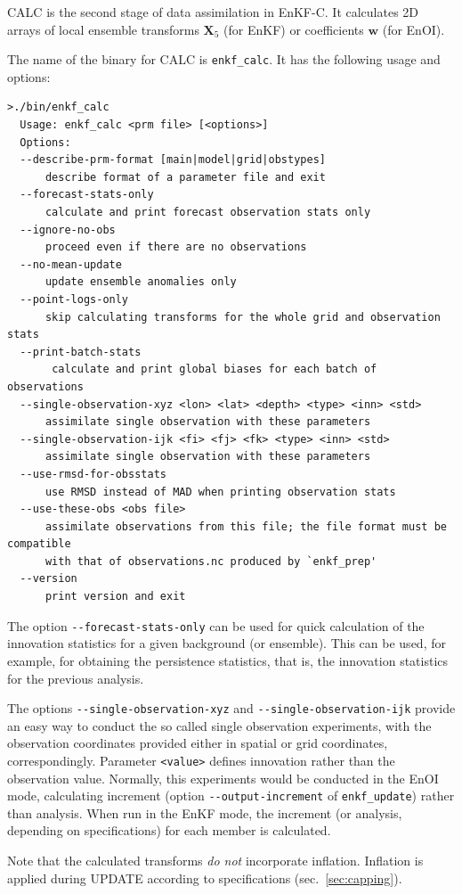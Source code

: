 \documentclass[11pt]{report}
\newcommand{\mb} {\mathbf}
\begin{document}
CALC is the second stage of data assimilation in EnKF-C.
It calculates 2D arrays of local ensemble transforms $\mb X_5$ (for EnKF) or coefficients $\mb w$ (for EnOI).

The name of the binary for CALC is \verb|enkf_calc|.
It has the following usage and options:
\begin{Verbatim}[frame=single,fontsize=\footnotesize]
>./bin/enkf_calc 
  Usage: enkf_calc <prm file> [<options>]
  Options:
  --describe-prm-format [main|model|grid|obstypes]
      describe format of a parameter file and exit
  --forecast-stats-only
      calculate and print forecast observation stats only
  --ignore-no-obs
      proceed even if there are no observations
  --no-mean-update
      update ensemble anomalies only
  --point-logs-only
      skip calculating transforms for the whole grid and observation stats
  --print-batch-stats
       calculate and print global biases for each batch of observations
  --single-observation-xyz <lon> <lat> <depth> <type> <inn> <std>
      assimilate single observation with these parameters
  --single-observation-ijk <fi> <fj> <fk> <type> <inn> <std>
      assimilate single observation with these parameters
  --use-rmsd-for-obsstats
      use RMSD instead of MAD when printing observation stats
  --use-these-obs <obs file>
      assimilate observations from this file; the file format must be compatible
      with that of observations.nc produced by `enkf_prep'
  --version
      print version and exit
\end{Verbatim}

The option \verb|--forecast-stats-only| can be used for quick calculation of the innovation statistics for a given background (or ensemble).
This can be used, for example, for obtaining the persistence statistics, that is, the innovation statistics for the previous analysis.

The options \verb|--single-observation-xyz| and \verb|--single-observation-ijk| provide an easy way to conduct the so called single observation experiments, with the observation coordinates provided either in spatial or grid coordinates, correspondingly.
Parameter \verb|<value>| defines innovation rather than the observation value.
Normally, this experiments would be conducted in the EnOI mode, calculating increment (option \verb|--output-increment| of \verb|enkf_update|) rather than analysis.
When run in the EnKF mode, the increment (or analysis, depending on specifications) for each member is calculated.

Note that the calculated transforms \emph{do not} incorporate inflation.
Inflation is applied during UPDATE according to specifications (sec.~\ref{sec:capping}).
\end{document}
